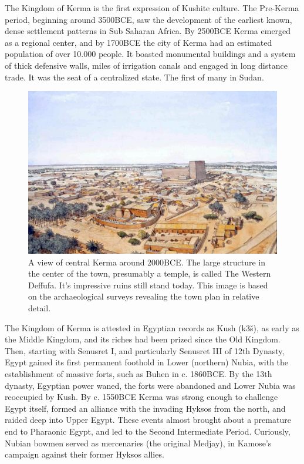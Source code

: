 \documentclass[a4paper,12pt]{scrreprt}
\begin{document}
The Kingdom of Kerma is the first expression of Kushite culture. The Pre-Kerma period, beginning around 3500BCE, saw the development of the earliest known, dense settlement patterns in Sub Saharan Africa. By 2500BCE Kerma emerged as a regional center, and by 1700BCE the city of Kerma had an estimated population of over 10.000 people. It boasted monumental buildings and a system of thick defensive walls, miles of irrigation canals and engaged in long distance trade. It was the seat of a centralized state. The first of many in Sudan. 
 
\begin{figure}[H]
	\centering
	\includegraphics[width=\textwidth]{img/central_kerma}
	\caption{A view of central Kerma around 2000BCE. The large structure in the center of the town, presumably a temple, is called The Western Deffufa. It's impressive ruins still stand today. This image is based on the archaeological surveys revealing the town plan in relative detail.}
\end{figure}

The Kingdom of Kerma is attested in Egyptian records as Kush (k3š), as early as the Middle Kingdom, and its riches had been prized since the Old Kingdom. Then, starting with Senusret I, and particularly Senusret III of 12th Dynasty, Egypt gained its first permanent foothold in Lower (northern) Nubia, with the establishment of massive forts, such as Buhen in c. 1860BCE. By the 13th dynasty, Egyptian power waned, the forts were abandoned and Lower Nubia was reoccupied by Kush. By c. 1550BCE Kerma was strong enough to challenge Egypt itself, formed an alliance with the invading Hyksos from the north, and raided deep into Upper Egypt. These events almost brought about a premature end to Pharaonic Egypt, and led to the Second Intermediate Period. Curiously, Nubian bowmen served as mercenaries (the original Medjay), in Kamose’s campaign against their former Hyksos allies. 
\end{document}
